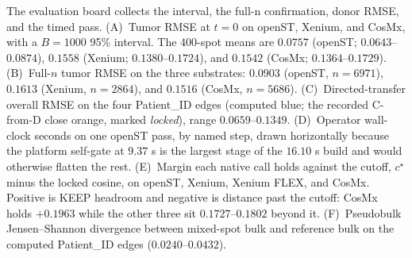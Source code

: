 The evaluation board collects the interval, the full-n confirmation, donor RMSE, and the timed pass. (A)~Tumor RMSE at \(t=0\) on openST, Xenium, and CosMx, with a \(B=1000\) 95\% interval. The 400-spot means are \(0.0757\) (openST; \(0.0643\)--\(0.0874\)), \(0.1558\) (Xenium; \(0.1380\)--\(0.1724\)), and \(0.1542\) (CosMx; \(0.1364\)--\(0.1729\)). (B)~Full-\(n\) tumor RMSE on the three substrates: \(0.0903\) (openST, \(n=6971\)), \(0.1613\) (Xenium, \(n=2864\)), and \(0.1516\) (CosMx, \(n=5686\)). (C)~Directed-transfer overall RMSE on the four Patient\_ID edges (computed blue; the recorded C-from-D close orange, marked \emph{locked}), range \(0.0659\)--\(0.1349\). (D)~Operator wall-clock seconds on one openST pass, by named step, drawn horizontally because the platform self-gate at \(9.37\) s is the largest stage of the \(16.10\) s build and would otherwise flatten the rest. (E)~Margin each native call holds against the cutoff, \(c^\star\) minus the locked cosine, on openST, Xenium, Xenium FLEX, and CosMx. Positive is KEEP headroom and negative is distance past the cutoff: CosMx holds \(+0.1963\) while the other three sit \(0.1727\)--\(0.1802\) beyond it. (F)~Pseudobulk Jensen--Shannon divergence between mixed-spot bulk and reference bulk on the computed Patient\_ID edges (\(0.0240\)--\(0.0432\)).

